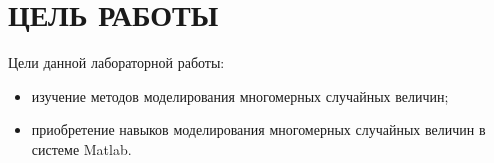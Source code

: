 \section{ЦЕЛЬ РАБОТЫ}

Цели данной лабораторной работы:

\begin{itemize}

\item
  изучение методов моделирования многомерных случайных величин;
\item
  приобретение навыков моделирования многомерных случайных величин в системе Matlab.

\end{itemize}
